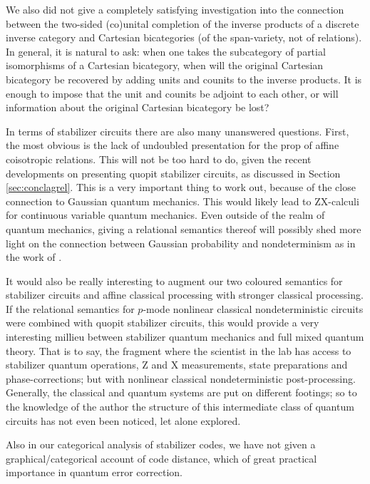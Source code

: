 \documentclass[12pt]{ociamthesis}  %
\begin{document}
We also did not give a completely satisfying investigation into the connection between the two-sided (co)unital completion of the inverse products of a discrete inverse category and Cartesian bicategories (of the span-variety, not of relations).  In general, it is natural to ask: when one takes the subcategory of partial isomorphisms of a Cartesian bicategory, when will the original Cartesian bicategory be recovered by adding units and counits to the inverse products.  It is enough to impose that the unit and counits be adjoint to each other, or will information about the original Cartesian bicategory be lost?


In terms of stabilizer circuits there are also many unanswered questions.  First, the most obvious is the lack of undoubled presentation for the prop of affine coisotropic relations.  This will not be too hard to do, given the recent developments on presenting quopit stabilizer circuits, as discussed in Section \ref{sec:conclagrel}.  This is a very important thing to work out, because of the close connection to Gaussian quantum mechanics.  This would likely lead to ZX-calculi for continuous variable quantum mechanics.  Even outside of the realm of quantum mechanics, giving  a relational semantics thereof will possibly shed more light on the connection between Gaussian probability and nondeterminism as in the work of \cite{stein}.


It would also be really interesting to augment our two coloured semantics for stabilizer circuits and affine classical processing with stronger classical processing.  If the relational semantics for $p$-mode nonlinear classical nondeterministic circuits were combined with quopit stabilizer circuits, this would provide a very interesting millieu between stabilizer quantum mechanics and full mixed quantum theory.  That is to say, the fragment where the scientist in the lab has access to stabilizer quantum operations, Z and X measurements, state preparations and phase-corrections; but with nonlinear classical nondeterministic post-processing.  Generally, the classical and quantum systems are put on different footings; so to the knowledge of the author the structure of this intermediate class of quantum circuits has not even been noticed, let alone explored.

Also in our categorical analysis of stabilizer codes, we have not given a graphical/categorical account of code distance, which of great practical importance in quantum error correction. 
\end{document}
